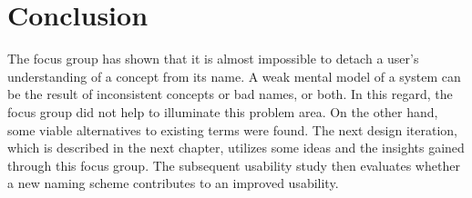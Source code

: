 \section{Conclusion}
The focus group has shown that it is almost impossible to detach a user’s understanding of a concept from its name. A weak mental model of a system can be the result of inconsistent concepts or bad names, or both. In this regard, the focus group did not help to illuminate this problem area. On the other hand, some viable alternatives to existing terms were found. The next design iteration, which is described in the next chapter, utilizes some ideas and the insights gained through this focus group. The subsequent usability study then evaluates whether a new naming scheme contributes to an improved usability.
